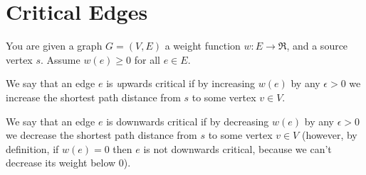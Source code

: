 \documentclass{article}
\begin{document}
\section{Critical Edges}

  You are given a graph $G=(V,E)$ a weight function $w:E \rightarrow
  \Re$, and a source vertex $s$. Assume $w(e) \geq 0$ for all $e \in
  E$.  

  We say that an edge $e$ is {\emph upwards critical} if by increasing
  $w(e)$ by any $\epsilon > 0$ we increase the shortest path distance
  from $s$ to some vertex $v \in V$.

  We say that an edge $e$ is downwards critical if by decreasing
  $w(e)$ by any $\epsilon >0$ we decrease the shortest path distance
  from $s$ to some vertex $v \in V$ (however, by definition, if
  $w(e)=0$ then $e$ is not downwards critical, because we can't
  decrease its weight below 0).
\end{document}
